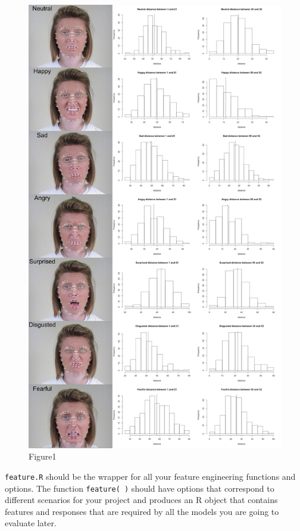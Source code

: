 \documentclass[
]{article}
\begin{document}
\begin{figure}
\centering
\includegraphics{../figs/feature_visualization.jpg}
\caption{Figure1}
\end{figure}

\texttt{feature.R} should be the wrapper for all your feature
engineering functions and options. The function \texttt{feature(\ )}
should have options that correspond to different scenarios for your
project and produces an R object that contains features and responses
that are required by all the models you are going to evaluate later.
\end{document}
